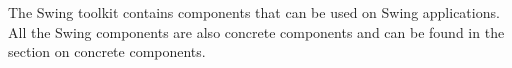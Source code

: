 
The Swing toolkit contains components that can be used on Swing applications. All the Swing components are also concrete components and can be found in the section on concrete components. 
